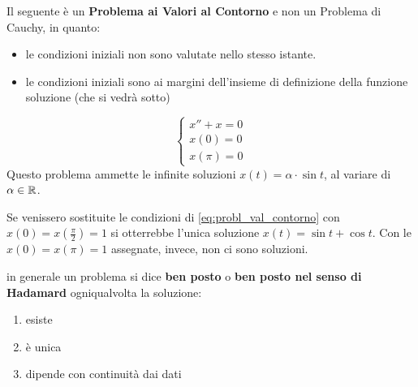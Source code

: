 \begin{example}
	Il seguente è un \textbf{Problema ai Valori al Contorno} e non un Problema di Cauchy, in quanto:
	\begin{itemize}[noitemsep]
		\item le condizioni iniziali non sono valutate nello stesso istante.
		\item le condizioni iniziali sono ai margini dell'insieme di definizione della funzione soluzione (che si vedrà sotto)
	\end{itemize}
	\begin{equation}
		\label{eq:probl_val_contorno}
		\begin{cases}
			x'' + x = 0\\
			x(0) = 0\\
			x(\pi) = 0
		\end{cases}
	\end{equation}
	Questo problema ammette le infinite soluzioni $x(t) = \alpha \cdot \sin t$, al variare di $\alpha \in \mathbb{R}$.

	Se venissero sostituite le condizioni di \cref{eq:probl_val_contorno} con $x(0) = x(\frac{\pi}{2}) = 1$ si otterrebbe l'unica soluzione $x(t) = \sin t + \cos t$. Con le $x(0) = x(\pi) = 1$ assegnate, invece, non ci sono soluzioni.
\end{example}

\begin{samepage}
\begin{observation}
	\label{obs:hadamard}
	in generale un problema si dice \textbf{ben posto} o \textbf{ben posto nel senso di Hadamard} ogniqualvolta la soluzione:
	\begin{enumerate}
		\item esiste
		\item è unica
		\item dipende con continuità dai dati
	\end{enumerate}
\end{observation}
\end{samepage}

\newpage
